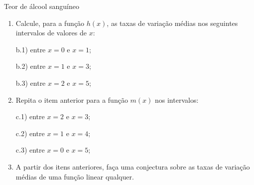 \begin{task}{Teor de álcool sanguíneo}
\begin{enumerate}
\item {} 
Calcule, para a função \(h(x)\), as taxas de variação médias nos seguintes intervalos de valores de \(x\):

b.1) entre \(x=0\) e \(x=1\);

b.2) entre \(x=1\) e \(x=3\);

b.3) entre \(x=2\) e \(x=5\);

\item {} 
Repita o item anterior para a função \(m(x)\) nos intervalos:

c.1) entre \(x=2\) e \(x=3\);

c.2) entre \(x=1\) e \(x=4\);

c.3) entre \(x=0\) e \(x=5\);

\item {} 
A partir dos itens anteriores, faça uma conjectura sobre as taxas de variação médias de uma função linear qualquer.

\end{enumerate}
\end{task}

